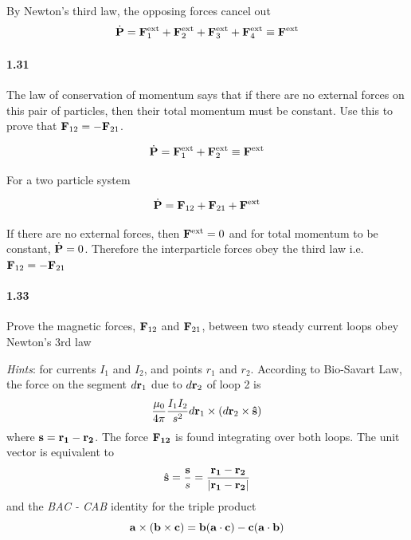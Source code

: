 \documentclass[../problems.tex]{subfiles}
\begin{document}
By Newton's third law, the opposing forces cancel out
\begin{equation*}
    \dot{\mathbf{P}} = \mathbf{F}_{1}^\text{ext} + \mathbf{F}_{2}^\text{ext} + \mathbf{F}_{3}^\text{ext} 
    + \mathbf{F}_{4}^\text{ext} \equiv \mathbf{F}^\text{ext}
\end{equation*}

\paragraph{1.31}
The law of conservation of momentum says that if there are no external forces on this pair of 
particles, then their total momentum must be constant. Use this to prove that 
$\mathbf{F}_{12} = -\mathbf{F}_{21}$.
\barh

\begin{equation*}
    \dot{\mathbf{P}} = \mathbf{F}_{1}^\text{ext} + \mathbf{F}_{2}^\text{ext} \equiv \mathbf{F}^\text{ext}
\end{equation*}

For a two particle system

\begin{equation*}
    \dot{\mathbf{P}} = \mathbf{F}_{12} + \mathbf{F}_{21} + \mathbf{F}^{\text{ext}}
\end{equation*}

If there are no external forces, then $\mathbf{F}^\text{ext} = 0$ and for total momentum to be 
constant, $\dot{\mathbf{P}} = 0$. Therefore the interparticle forces obey the third law i.e.
$\mathbf{F}_{12} = -\mathbf{F}_{21}$

\paragraph{1.33}
Prove the magnetic forces, $\mathbf{F}_{12}$ and $\mathbf{F}_{21}$, between two steady current loops 
obey Newton's 3rd law
\barh

\textit{Hints}: for currents $I_1$ and $I_2$, and points $r_1$ and $r_2$. According to Bio-Savart 
Law, the force on the segment $d\mathbf{r}_1$ due to $d\mathbf{r}_2$ of loop 2 is
\begin{equation*}
    \frac{\mu_0}{4\pi} \frac{I_1 I_2}{s^2} d\mathbf{r}_1 \times (d\mathbf{r}_2 \times \mathbf{\hat s})
\end{equation*}
where $\mathbf{s} = \mathbf{r_1} - \mathbf{r_2}$. The force $\mathbf{F_{12}}$ is found integrating over both
loops. The unit vector is equivalent to
\begin{equation*}
    \hat{\mathbf{s}} = \frac{\mathbf{s}}{s} = \frac{\mathbf{r_1} - \mathbf{r_2}}{|\mathbf{r_1} - \mathbf{r_2}|}
\end{equation*}
and the \emph{BAC - CAB} identity for the triple product
\begin{equation*}
    \mathbf{a} \times (\mathbf{b} \times \mathbf{c}) = \mathbf{b}(\mathbf{a} \cdot \mathbf{c}) 
    - \mathbf{c}(\mathbf{a} \cdot \mathbf{b})
\end{equation*}
\end{document}
